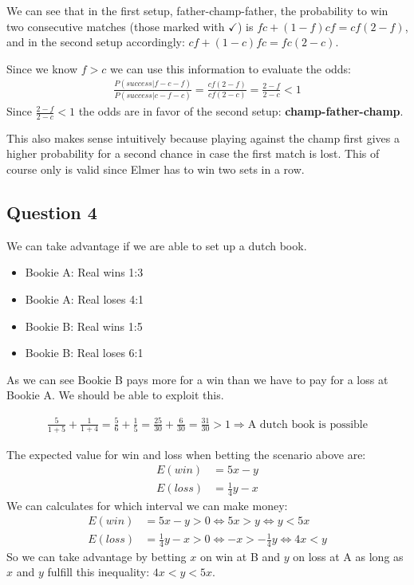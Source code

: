 We can see that in the first setup, father-champ-father, the probability to win two consecutive matches (those marked with $\checkmark$) is $fc+(1-f)cf=cf(2-f)$, and in the second setup accordingly: $cf+(1-c)fc=fc(2-c)$.

Since we know $f>c$ we can use this information to evaluate the odds:
\begin{align*}
\frac{P(success|f-c-f)}{P(success|c-f-c)} = \frac{cf(2-f)}{cf(2-c)} = \frac{2-f}{2-c} < 1
\end{align*}
Since $\frac{2-f}{2-c} < 1$ the odds are in favor of the second setup: \textbf{champ-father-champ}.

This also makes sense intuitively because playing against the champ first gives a higher probability for a second chance in case the first match is lost. This of course only is valid since Elmer has to win two sets in a row.



\subsection*{Question 4}
We can take advantage if we are able to set up a dutch book.
\begin{itemize}
	\item Bookie A: Real wins 1:3
  \item Bookie A: Real loses 4:1
	\item Bookie B: Real wins 1:5
  \item Bookie B: Real loses 6:1
\end{itemize}

As we can see Bookie B pays more for a win than we have to pay for a loss at Bookie A. We should be able to exploit this.

\begin{align*}
\frac{5}{1+5}+\frac{1}{1+4} = \frac{5}{6} + \frac{1}{5} = \frac{25}{30} + \frac{6}{30} = \frac{31}{30} > 1 \Rightarrow \text{A dutch book is possible}
\end{align*}

The expected value for win and loss when betting the scenario above are:
\begin{align*}
E(win)  &= 5x-y \\
E(loss) &= \frac{1}{4}y-x
\end{align*}
We can calculates for which interval we can make money:
\begin{align*}
E(win)  &= 5x-y           > 0 \Leftrightarrow 5x>y             \Leftrightarrow y < 5x \\
E(loss) &= \frac{1}{4}y-x > 0 \Leftrightarrow -x>-\frac{1}{4}y \Leftrightarrow 4x < y
\end{align*}
So we can take advantage by betting $x$ on win at B and $y$ on loss at A as long as $x$ and $y$ fulfill this inequality: $4x<y<5x$.



